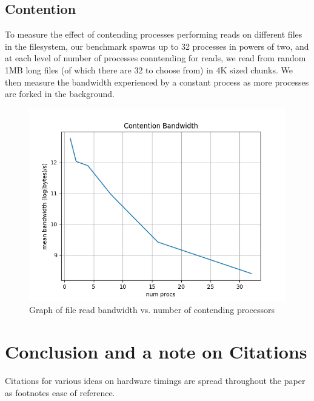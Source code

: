 \documentclass[letterpaper,twocolumn,10pt]{article}
\begin{document}
\subsection{Contention}
To measure the effect of contending processes performing reads on different
files in the filesystem, our benchmark spawns up to 32 processes in powers of
two, and at each level of number of processes conntending for reads, we read
from random 1MB long files (of which there are 32 to choose from) in 4K sized 
chunks. We then measure the bandwidth experienced by a constant process as more
processes are forked in the background.

\begin{figure}
	\centering
	\includegraphics{graphs/contention}
  \caption{Graph of file read bandwidth vs. number of contending processors}
	\label{fig:filecache}
\end{figure}
\section{Conclusion and a note on Citations}

Citations for various ideas on hardware timings are spread throughout the paper as footnotes 
ease of reference. 



{\normalsize 
}


\end{document}
